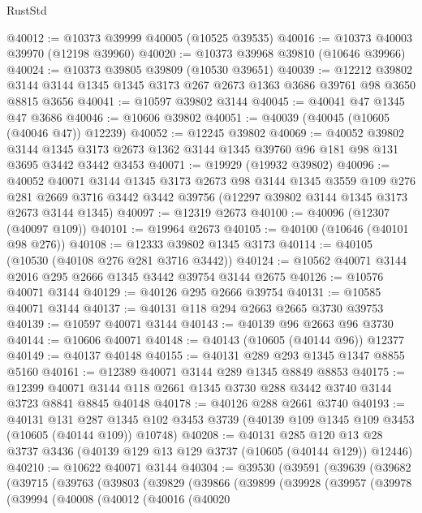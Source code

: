 \begin{lexlean}{RustStd}
\begin{coremodule}
@40012 := @10373 @39999 @40005 (@10525 @39535)
@40016 := @10373 @40003 @39970 (@12198 @39960)
@40020 := @10373 @39968 @39810 (@10646 @39966)
@40024 := @10373 @39805 @39809 (@10530 @39651)
@40039 := @12212
    @39802
    @3144
    @3144
    @1345
    @1345
    @3173
    @267
    @2673
    @1363
    @3686
    @39761
    @98
    @3650
    @8815
    @3656
@40041 := @10597 @39802 @3144
@40045 := @40041 @47 @1345 @47 @3686
@40046 := @10606 @39802
@40051 := @40039 (@40045 (@10605 (@40046 @47)) @12239)
@40052 := @12245 @39802
@40069 := @40052
    @39802
    @3144
    @1345
    @3173
    @2673
    @1362
    @3144
    @1345
    @39760
    @96
    @181
    @98
    @131
    @3695
    @3442
    @3442
    @3453
@40071 := @19929 (@19932 @39802)
@40096 := @40052
    @40071
    @3144
    @1345
    @3173
    @2673
    @98
    @3144
    @1345
    @3559
    @109
    @276
    @281
    @2669
    @3716
    @3442
    @3442
    @39756
    (@12297 @39802 @3144 @1345 @3173 @2673 @3144 @1345)
@40097 := @12319 @2673
@40100 := @40096 (@12307 (@40097 @109))
@40101 := @19964 @2673
@40105 := @40100 (@10646 (@40101 @98 @276))
@40108 := @12333 @39802 @1345 @3173
@40114 := @40105 (@10530 (@40108 @276 @281 @3716 @3442))
@40124 := @10562 @40071 @3144 @2016 @295 @2666 @1345 @3442 @39754 @3144 @2675
@40126 := @10576 @40071 @3144
@40129 := @40126 @295 @2666 @39754
@40131 := @10585 @40071 @3144
@40137 := @40131 @118 @294 @2663 @2665 @3730 @39753
@40139 := @10597 @40071 @3144
@40143 := @40139 @96 @2663 @96 @3730
@40144 := @10606 @40071
@40148 := @40143 (@10605 (@40144 @96)) @12377
@40149 := @40137 @40148
@40155 := @40131 @289 @293 @1345 @1347 @8855 @5160
@40161 := @12389 @40071 @3144 @289 @1345 @8849 @8853
@40175 := @12399 @40071 @3144 @118 @2661 @1345 @3730 @288 @3442 @3740 @3144 @3723 @8841 @8845 @40148
@40178 := @40126 @288 @2661 @3740
@40193 := @40131
    @131
    @287
    @1345
    @102
    @3453
    @3739
    (@40139 @109 @1345 @109 @3453 (@10605 (@40144 @109)) @10748)
@40208 := @40131
    @285
    @120
    @13
    @28
    @3737
    @3436
    (@40139 @129 @13 @129 @3737 (@10605 (@40144 @129)) @12446)
@40210 := @10622 @40071 @3144
@40304 := @39530
    (@39591
      (@39639
        (@39682
          (@39715
            (@39763
              (@39803
                (@39829
                  (@39866
                    (@39899
                      (@39928
                        (@39957
                          (@39978
                            (@39994
                              (@40008
                                (@40012
                                  (@40016
                                    (@40020

\end{coremodule}
\end{lexlean}

